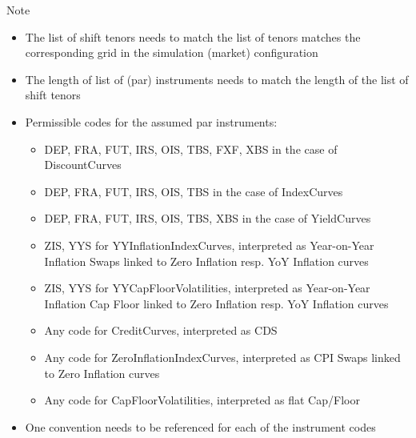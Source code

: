 Note
\begin{itemize}
\item The list of shift tenors needs to match the list of tenors matches the corresponding grid in the simulation (market) configuration
\item The length of list of (par) instruments needs to match the length of the list of shift tenors
\item Permissible codes for the assumed par instruments:
	\begin{itemize}
	\item DEP, FRA, FUT, IRS, OIS, TBS, FXF, XBS in the case of DiscountCurves
	\item DEP, FRA, FUT, IRS, OIS, TBS in the case of IndexCurves
	\item DEP, FRA, FUT, IRS, OIS, TBS, XBS in the case of YieldCurves
	\item ZIS, YYS for YYInflationIndexCurves, interpreted as Year-on-Year Inflation Swaps linked to Zero Inflation resp. YoY Inflation curves
	\item ZIS, YYS for YYCapFloorVolatilities, interpreted as Year-on-Year Inflation Cap Floor linked to Zero Inflation resp. YoY Inflation curves
	\item Any code for CreditCurves, interpreted as CDS
	\item Any code for ZeroInflationIndexCurves, interpreted as CPI Swaps linked to Zero Inflation curves
	\item Any code for CapFloorVolatilities, interpreted as flat Cap/Floor
	\end{itemize}
\item One convention needs to be referenced for each of the instrument codes
\end{itemize}
